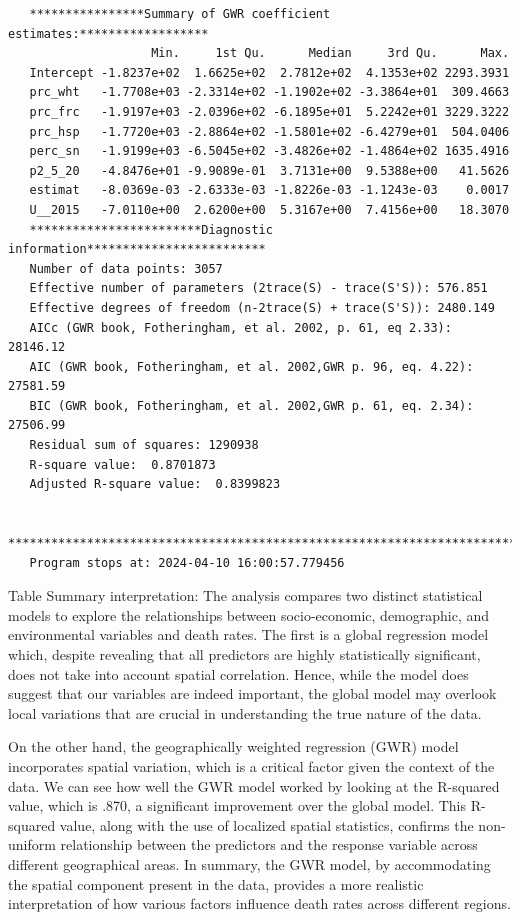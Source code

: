 \documentclass[
]{article}
\begin{document}
\begin{verbatim}
   ****************Summary of GWR coefficient estimates:******************
                    Min.     1st Qu.      Median     3rd Qu.      Max.
   Intercept -1.8237e+02  1.6625e+02  2.7812e+02  4.1353e+02 2293.3931
   prc_wht   -1.7708e+03 -2.3314e+02 -1.1902e+02 -3.3864e+01  309.4663
   prc_frc   -1.9197e+03 -2.0396e+02 -6.1895e+01  5.2242e+01 3229.3222
   prc_hsp   -1.7720e+03 -2.8864e+02 -1.5801e+02 -6.4279e+01  504.0406
   perc_sn   -1.9199e+03 -6.5045e+02 -3.4826e+02 -1.4864e+02 1635.4916
   p2_5_20   -4.8476e+01 -9.9089e-01  3.7131e+00  9.5388e+00   41.5626
   estimat   -8.0369e-03 -2.6333e-03 -1.8226e-03 -1.1243e-03    0.0017
   U__2015   -7.0110e+00  2.6200e+00  5.3167e+00  7.4156e+00   18.3070
   ************************Diagnostic information*************************
   Number of data points: 3057 
   Effective number of parameters (2trace(S) - trace(S'S)): 576.851 
   Effective degrees of freedom (n-2trace(S) + trace(S'S)): 2480.149 
   AICc (GWR book, Fotheringham, et al. 2002, p. 61, eq 2.33): 28146.12 
   AIC (GWR book, Fotheringham, et al. 2002,GWR p. 96, eq. 4.22): 27581.59 
   BIC (GWR book, Fotheringham, et al. 2002,GWR p. 61, eq. 2.34): 27506.99 
   Residual sum of squares: 1290938 
   R-square value:  0.8701873 
   Adjusted R-square value:  0.8399823 

   ***********************************************************************
   Program stops at: 2024-04-10 16:00:57.779456 
\end{verbatim}

Table Summary interpretation: The analysis compares two distinct
statistical models to explore the relationships between socio-economic,
demographic, and environmental variables and death rates. The first is a
global regression model which, despite revealing that all predictors are
highly statistically significant, does not take into account spatial
correlation. Hence, while the model does suggest that our variables are
indeed important, the global model may overlook local variations that
are crucial in understanding the true nature of the data.~

On the other hand, the geographically weighted regression (GWR) model
incorporates spatial variation, which is a critical factor given the
context of the data. We can see how well the GWR model worked by looking
at the R-squared value, which is .870, a significant improvement over
the global model. This R-squared value, along with the use of localized
spatial statistics, confirms the non-uniform relationship between the
predictors and the response variable across different geographical
areas. In summary, the GWR model, by accommodating the spatial component
present in the data, provides a more realistic interpretation of how
various factors influence death rates across different regions.
\end{document}
